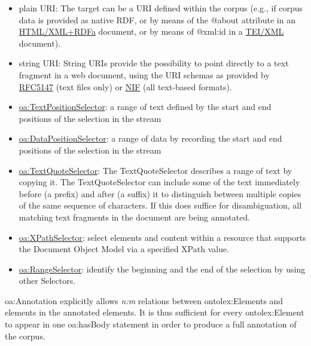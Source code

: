 \documentclass[a4paper]{article}
\newcommand\textstyleInternetlink[1]{\textcolor[rgb]{0.0,0.0,0.5019608}{#1}}
\newcommand\textstyleTeletype[1]{\textrm{#1}}
\newcommand\liststyleWWNumix{%
\renewcommand\labelitemi{[F0B7?]}
\renewcommand\labelitemii{[F0B7?]}
\renewcommand\labelitemiii{[F0B7?]}
\renewcommand\labelitemiv{[F0B7?]}
}
\begin{document}
\liststyleWWNumix
\begin{itemize}
\item plain URI: The target can be a URI defined within the corpus (e.g., if corpus data is provided as native RDF, or by means of the \textstyleTeletype{@about} attribute in an \href{https://www.w3.org/TR/rdfa-primer/}{\textstyleInternetlink{HTML/XML+RDFa}} document, or by means of \textstyleTeletype{@xml:id} in a \href{http://www.tei-c.org/release/doc/tei-p5-doc/en/html/ref-att.global.html}{\textstyleInternetlink{TEI/XML}} document). 
\item string URI: String URIs provide the possibility to point directly to a text fragment in a web document, using the URI schemas as provided by \href{https://tools.ietf.org/html/rfc5147}{\textstyleInternetlink{RFC5147}} (text files only) or \href{http://persistence.uni-leipzig.org/nlp2rdf/ontologies/nif-core/nif-core.html#introduction}{\textstyleInternetlink{NIF}} (all text-based formats). 
\item \href{https://www.w3.org/TR/annotation-vocab/#textpositionselector}{\textstyleInternetlink{oa:TextPositionSelector}}: a range of text defined by the start and end positions of the selection in the stream 
\item \href{https://www.w3.org/TR/annotation-vocab/#datapositionselector}{\textstyleInternetlink{oa:DataPositionSelector}}: a range of data by recording the start and end positions of the selection in the stream 
\item \href{https://www.w3.org/TR/annotation-vocab/#textquoteselector}{\textstyleInternetlink{oa:TextQuoteSelector}}: The TextQuoteSelector describes a range of text by copying it. The TextQuoteSelector can include some of the text immediately before (a prefix) and after (a suffix) it to distinguish between multiple copies of the same sequence of characters. If this does suffice for disambiguation, all matching text fragments in the document are being annotated. 
\item \href{https://www.w3.org/TR/annotation-vocab/#xpathselector}{\textstyleInternetlink{oa:XPathSelector}}: select elements and content within a resource that supports the Document Object Model via a specified XPath value. 
\item \href{https://www.w3.org/TR/annotation-vocab/#rangeselector}{\textstyleInternetlink{oa:RangeSelector}}: identify the beginning and the end of the selection by using other Selectors. 
\end{itemize}
\textstyleTeletype{oa:Annotation} explicitly allows \textit{n:m} relations between \textstyleTeletype{ontolex:Element}s and elements in the annotated elements. It is thus sufficient for every \textstyleTeletype{ontolex:Element} to appear in one \textstyleTeletype{oa:hasBody} statement in order to produce a full annotation of the corpus. 
\end{document}
